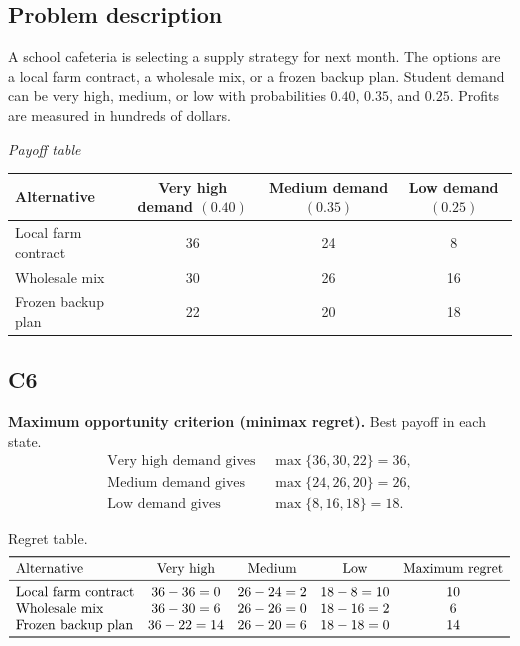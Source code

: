

	
	\begin{ExamProblems}
		\item
		\subsection*{Problem description}
		A school cafeteria is selecting a supply strategy for next month. The options are a local farm contract, a wholesale mix, or a frozen backup plan. Student demand can be very high, medium, or low with probabilities $0.40$, $0.35$, and $0.25$. Profits are measured in hundreds of dollars.

		\begin{center}
			\textit{Payoff table}\\
			\begin{tabular}{l c c c}
				\toprule
				Alternative & Very high demand $(0.40)$ & Medium demand $(0.35)$ & Low demand $(0.25)$ \\
				\midrule
				Local farm contract & 36 & 24 & 8 \\
				Wholesale mix & 30 & 26 & 16 \\
				Frozen backup plan & 22 & 20 & 18 \\
				\bottomrule
			\end{tabular}
		\end{center}

		\subsection*{C6}
		\textbf{Maximum opportunity criterion (minimax regret).} Best payoff in each state.
		\[
		\begin{aligned}
		\text{Very high demand gives } &\max\{36,30,22\}=36,\\
		\text{Medium demand gives } &\max\{24,26,20\}=26,\\
		\text{Low demand gives } &\max\{8,16,18\}=18.
		\end{aligned}
		\]

		Regret table.
		\[
		\begin{array}{lcccc}
			\toprule
			\text{Alternative} & \text{Very high} & \text{Medium} & \text{Low} & \text{Maximum regret}\\
			\midrule
			\text{Local farm contract} & 36-36=0 & 26-24=2 & 18-8=10 & 10\\
			\text{Wholesale mix} & 36-30=6 & 26-26=0 & 18-16=2 & 6\\
			\text{Frozen backup plan} & 36-22=14 & 26-20=6 & 18-18=0 & 14\\
			\bottomrule
		\end{array}
		\]


\end{ExamProblems}
